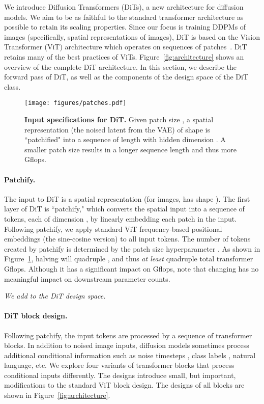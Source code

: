 \documentclass[10pt,twocolumn,letterpaper]{article}
\begin{document}
We introduce Diffusion Transformers (DiTs), a new architecture for diffusion models. We aim to be as faithful to the standard transformer architecture as possible to retain its scaling properties. Since our focus is training DDPMs of images (specifically, spatial representations of images), DiT is based on the Vision Transformer (ViT) architecture which operates on sequences of patches~\cite{Dosovitskiy2020}. DiT retains many of the best practices of ViTs. Figure~\ref{fig:architecture} shows an overview of the complete DiT architecture. In this section, we describe the forward pass of DiT, as well as the components of the design space of the DiT class.



\begin{figure}\centering
\texttt{[image: figures/patches.pdf]}
\caption{\textbf{Input specifications for DiT.} Given patch size , a spatial representation (the noised latent from the VAE) of shape  is ``patchified" into a sequence of length  with hidden dimension . A smaller patch size  results in a longer sequence length and thus more Gflops.}\vspace{-2mm}
\label{fig:patchify}
\end{figure}
\vspace{-2mm}
\paragraph{Patchify.} The input to DiT is a spatial representation  (for  images,  has shape ). The first layer of DiT is ``patchify," which converts the spatial input into a sequence of  tokens, each of dimension , by linearly embedding each patch in the input. Following patchify, we apply standard ViT frequency-based positional embeddings (the sine-cosine version) to all input tokens. The number of tokens  created by patchify is determined by the patch size hyperparameter . As shown in Figure~\ref{fig:patchify}, halving  will quadruple , and thus \textit{at least} quadruple total transformer Gflops. Although it has a significant impact on Gflops, note that changing  has no meaningful impact on downstream parameter counts. 

\emph{We add  to the DiT design space.} 
\vspace{-2mm}
\paragraph{DiT block design.} Following patchify, the input tokens are processed by a sequence of transformer blocks. In addition to noised image inputs, diffusion models sometimes process additional conditional information such as noise timesteps , class labels , natural language, etc. We explore four variants of transformer blocks that process conditional inputs differently. The designs introduce small, but important, modifications to the standard ViT block design. The designs of all blocks are shown in Figure~\ref{fig:architecture}.
\end{document}
